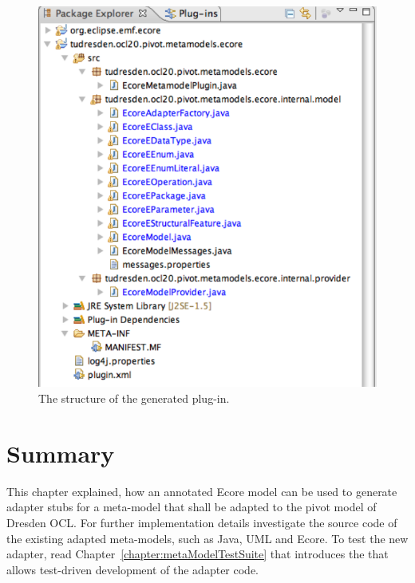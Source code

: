 \begin{figure}[!htbp]
	\centering
	\includegraphics[width=0.7\linewidth]{figures/pivotModelAdaption/GeneratedPlugin}
	\caption{The structure of the generated plug-in.}
	\label{pic:pivotModelAdaption:GeneratedPlugin}
\end{figure}



\section{Summary}

This chapter explained, how an annotated Ecore model can be used to generate 
adapter stubs for a meta-model that shall be adapted to the pivot model of
Dresden OCL. For further implementation details investigate the source code of
the existing adapted meta-models, such as Java, \acs{UML} and Ecore. To test 
the new adapter, read Chapter~\ref{chapter:metaModelTestSuite} that introduces 
the  that allows test-driven development 
of the adapter code.
